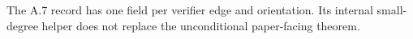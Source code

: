 
The A.7 record has one field per verifier edge and orientation. Its internal
small-degree helper does not replace the unconditional paper-facing theorem.


